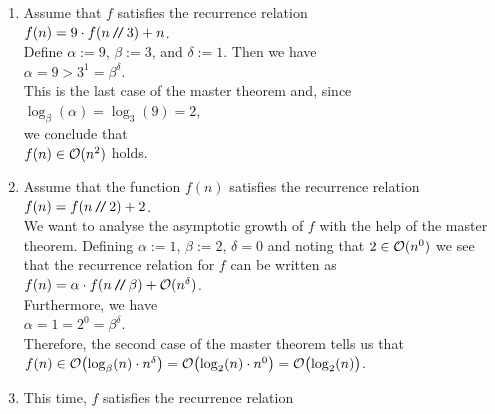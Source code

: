 \examples
\begin{enumerate}
\item Assume that $f$ satisfies the recurrence relation
      \\[0.2cm]
      \hspace*{1.3cm}
      $f(n) = 9 \cdot f(n \mbox{\,\texttt{/}$\!$\texttt{/}\,} 3) + n$.
      \\[0.2cm] 
      Define $\alpha := 9$, $\beta := 3$, and $\delta := 1$.
      Then we have
      \\[0.2cm]
      \hspace*{1.3cm}
      $\alpha = 9 > 3^1 = \beta^\delta$.
      \\[0.2cm] 
      This is the last case of the master theorem and, since 
      \\[0.2cm]
      \hspace*{1.3cm}
      $\log_{\beta}(\alpha) = \log_3(9) = 2$,
      \\[0.2cm]
      we conclude that
      \\[0.2cm]
      \hspace*{1.3cm}
      $f(n) \in \mathcal{O}(n^2)$ \quad holds.
\item Assume that the function $f(n)$ satisfies the recurrence relation
      \\[0.2cm]
      \hspace*{1.3cm}
      $f(n) = f(n \mbox{\,\texttt{/}$\!$\texttt{/}\,} 2) + 2$.
      \\[0.2cm]
      We want to analyse the asymptotic growth of $f$ with the help of the master theorem.
      Defining $\alpha := 1$, $\beta := 2$,  $\delta = 0$ and noting that $2 \in \mathcal{O}(n^0)$ we see that
      the recurrence relation for $f$ can be written as
      \\[0.2cm]
      \hspace*{1.3cm}
      $f(n) = \alpha \cdot f(n \mbox{\,\texttt{/}$\!$\texttt{/}\,} \beta) + \mathcal{O}(n^\delta)$.
      \\[0.2cm]
      Furthermore, we have
      \\[0.2cm]
      \hspace*{1.3cm}
      $\alpha = 1 = 2^0 = \beta^\delta$.
      \\[0.2cm]
      Therefore, the second case of the master theorem tells us that
      \\[0.2cm]
      \hspace*{1.3cm}
      $f(n) \in \mathcal{O}\bigl(\log_\beta(n) \cdot n^\delta\bigr) = \mathcal{O}\bigl(\log_2(n) \cdot n^0\bigr) = \mathcal{O}\bigl(\log_2(n)\bigr)$.
\item This time, $f$ satisfies the recurrence relation 
      \\[0.2cm]

\end{enumerate}
